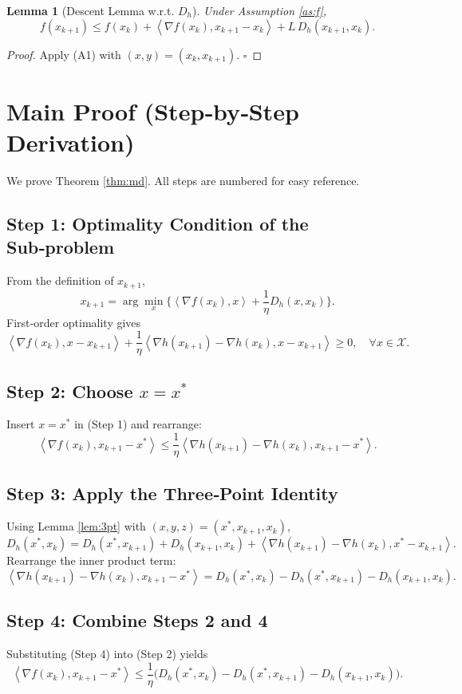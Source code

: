 \documentclass{article}
\newtheorem{lemma}{Lemma}
\newcommand{\ip}[2]{\left\langle #1,#2\right\rangle}
\newcommand{\D}[2]{D_h(#1,#2)}
\newcommand{\grad}[1]{\nabla #1}
\begin{document}
\begin{lemma}[Descent Lemma w.r.t. $D_h$]
\label{lem:descent}
Under Assumption \ref{as:f},
\[
f(x_{k+1})\le f(x_k)+\ip{\grad{f}(x_k)}{x_{k+1}-x_k}+L\,\D{x_{k+1}}{x_k}.
\tag{L2}
\]
\end{lemma}
\begin{proof}
Apply (A1) with $(x,y)=(x_k,x_{k+1})$. \hfill $\square$
\end{proof}

\section*{Main Proof (Step‑by‑Step Derivation)}
We prove Theorem \ref{thm:md}. All steps are numbered for easy reference.

\subsection*{Step 1: Optimality Condition of the Sub‑problem}
From the definition of $x_{k+1}$,
\[
x_{k+1}= \arg\min_{x}\Big\{\ip{\grad{f}(x_k)}{x}+ \frac1\eta \D{x}{x_k}\Big\}.
\]
First‑order optimality gives
\[
\ip{\grad{f}(x_k)}{x-x_{k+1}}+\frac1\eta\ip{\grad{h}(x_{k+1})-\grad{h}(x_k)}{x-x_{k+1}}\ge 0,
\quad\forall x\in\mathcal{X}.
\tag{Step 1}
\]

\subsection*{Step 2: Choose $x=x^*$}
Insert $x=x^*$ in (Step 1) and rearrange:
\[
\ip{\grad{f}(x_k)}{x_{k+1}-x^*}\le 
\frac1\eta\ip{\grad{h}(x_{k+1})-\grad{h}(x_k)}{x_{k+1}-x^*}.
\tag{Step 2}
\]

\subsection*{Step 3: Apply the Three‑Point Identity}
Using Lemma \ref{lem:3pt} with $(x,y,z)=(x^*,x_{k+1},x_k)$,
\[
\D{x^*}{x_k}= \D{x^*}{x_{k+1}}+\D{x_{k+1}}{x_k}
+\ip{\grad{h}(x_{k+1})-\grad{h}(x_k)}{x^*-x_{k+1}}.
\tag{Step 3}
\]
Rearrange the inner product term:
\[
\ip{\grad{h}(x_{k+1})-\grad{h}(x_k)}{x_{k+1}-x^*}
= \D{x^*}{x_k}-\D{x^*}{x_{k+1}}-\D{x_{k+1}}{x_k}.
\tag{Step 4}
\]

\subsection*{Step 4: Combine Steps 2 and 4}
Substituting (Step 4) into (Step 2) yields
\[
\ip{\grad{f}(x_k)}{x_{k+1}-x^*}
\le \frac1\eta\Big(\D{x^*}{x_k}-\D{x^*}{x_{k+1}}-\D{x_{k+1}}{x_k}\Big).
\tag{Step 5}
\]
\end{document}
